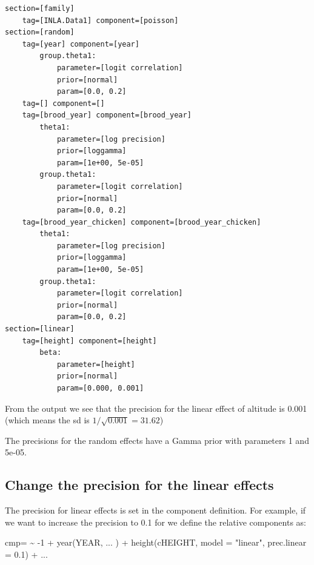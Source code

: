 \documentclass[
  letterpaper,
  DIV=11,
  numbers=noendperiod]{scrartcl}
\newenvironment{Shaded}{\begin{snugshade}}{\end{snugshade}}
\newcommand{\AttributeTok}[1]{\textcolor[rgb]{0.40,0.45,0.13}{#1}}
\newcommand{\DecValTok}[1]{\textcolor[rgb]{0.68,0.00,0.00}{#1}}
\newcommand{\ErrorTok}[1]{\textcolor[rgb]{0.68,0.00,0.00}{#1}}
\newcommand{\FloatTok}[1]{\textcolor[rgb]{0.68,0.00,0.00}{#1}}
\newcommand{\FunctionTok}[1]{\textcolor[rgb]{0.28,0.35,0.67}{#1}}
\newcommand{\NormalTok}[1]{\textcolor[rgb]{0.00,0.23,0.31}{#1}}
\newcommand{\OtherTok}[1]{\textcolor[rgb]{0.00,0.23,0.31}{#1}}
\newcommand{\SpecialCharTok}[1]{\textcolor[rgb]{0.37,0.37,0.37}{#1}}
\newcommand{\StringTok}[1]{\textcolor[rgb]{0.13,0.47,0.30}{#1}}
\begin{document}
\begin{verbatim}
section=[family]
    tag=[INLA.Data1] component=[poisson]
section=[random]
    tag=[year] component=[year]
        group.theta1:
            parameter=[logit correlation]
            prior=[normal]
            param=[0.0, 0.2]
    tag=[] component=[]
    tag=[brood_year] component=[brood_year]
        theta1:
            parameter=[log precision]
            prior=[loggamma]
            param=[1e+00, 5e-05]
        group.theta1:
            parameter=[logit correlation]
            prior=[normal]
            param=[0.0, 0.2]
    tag=[brood_year_chicken] component=[brood_year_chicken]
        theta1:
            parameter=[log precision]
            prior=[loggamma]
            param=[1e+00, 5e-05]
        group.theta1:
            parameter=[logit correlation]
            prior=[normal]
            param=[0.0, 0.2]
section=[linear]
    tag=[height] component=[height]
        beta:
            parameter=[height]
            prior=[normal]
            param=[0.000, 0.001]
\end{verbatim}

From the output we see that the precision for the linear effect of
altitude is 0.001 (which means the sd is \(1/\sqrt{0.001} = 31.62\))

The precisions for the random effects have a Gamma prior with parameters
1 and 5e-05.

\subsection{Change the precision for the linear
effects}\label{change-the-precision-for-the-linear-effects}

The precision for linear effects is set in the component definition. For
example, if we want to increase the precision to 0.1 for we define the
relative components as:

\begin{Shaded}
\begin{Highlighting}[]
\NormalTok{cmp}\OtherTok{=} \ErrorTok{\textasciitilde{}} \SpecialCharTok{{-}}\DecValTok{1} \SpecialCharTok{+} \FunctionTok{year}\NormalTok{(YEAR, ... ) }\SpecialCharTok{+}
  \FunctionTok{height}\NormalTok{(cHEIGHT, }\AttributeTok{model =}  \StringTok{"linear"}\NormalTok{, }\AttributeTok{prec.linear =} \FloatTok{0.1}\NormalTok{) }\SpecialCharTok{+}\NormalTok{ ...}
\end{Highlighting}
\end{Shaded}
\end{document}
